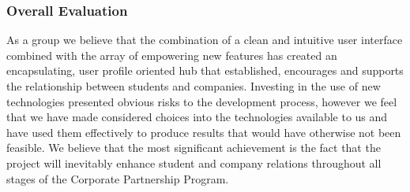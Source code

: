 	\subsubsection{Overall Evaluation}
As a group we believe that the combination of a clean and intuitive user interface combined with the array of empowering new features has created an encapsulating, user profile oriented hub that established, encourages and supports the relationship between students and companies. 
Investing in the use of new technologies presented obvious risks to the development process, however we feel that we have made considered choices into the technologies available to us and have used them effectively to produce results that would have otherwise not been feasible.
We believe that the most significant achievement is the fact that the project will inevitably enhance student and company relations throughout all stages of the Corporate Partnership Program.
